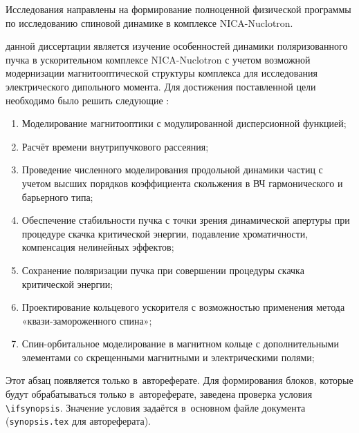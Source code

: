 {\actuality} Исследования направлены на формирование полноценной физической программы по исследованию спиновой динамике в комплексе NICA-Nuclotron.

{\aim} данной диссертации является изучение 
особенностей динамики поляризованного пучка в ускорительном 
комплексе NICA-Nuclotron с учетом возможной модернизации 
магнитооптической структуры комплекса для исследования 
электрического дипольного момента.
Для достижения поставленной цели необходимо было 
решить следующие {\tasks}:

\begin{enumerate}[beginpenalty=10000] %
  \item Моделирование магнитооптики с модулированной дисперсионной функцией;
  \item Расчёт времени внутрипучкового рассеяния;
  \item Проведение численного моделирования продольной динамики частиц с учетом высших порядков коэффициента скольжения в ВЧ гармонического и барьерного типа;
  \item Обеспечение стабильности пучка с точки зрения динамической апертуры при процедуре скачка критической энергии, подавление хроматичности, компенсация нелинейных эффектов;
  \item Сохранение поляризации пучка при совершении процедуры скачка критической энергии;
  \item Проектирование кольцевого ускорителя с возможностью применения метода «квази-замороженного спина»;
  \item Спин-орбитальное моделирование в магнитном кольце с дополнительными элементами со скрещенными магнитными и электрическими полями; 
\end{enumerate}

\ifsynopsis
Этот абзац появляется только в~автореферате.
Для формирования блоков, которые будут обрабатываться только в~автореферате,
заведена проверка условия \verb!\!\verb!ifsynopsis!.
Значение условия задаётся в~основном файле документа (\verb!synopsis.tex! для
автореферата).
\else
\fi


